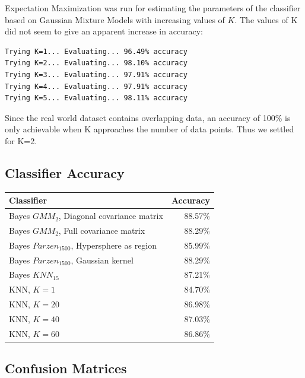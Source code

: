 \documentclass[a4paper]{article}
\begin{document}
Expectation Maximization was run for estimating the parameters of the
classifier based on Gaussian Mixture Models with increasing values of $K$.
The values of K did not seem to give an apparent increase in accuracy:

\begin{verbatim}
Trying K=1... Evaluating... 96.49% accuracy
Trying K=2... Evaluating... 98.10% accuracy
Trying K=3... Evaluating... 97.91% accuracy
Trying K=4... Evaluating... 97.91% accuracy
Trying K=5... Evaluating... 98.11% accuracy
\end{verbatim}

Since the real world dataset contains overlapping data, an accuracy of 100\%
is only achievable when K approaches the number of data points. Thus we settled
for K=2.


\subsection{Classifier Accuracy}

\begin{tabular}{ | l | r | }
\hline
\textbf{Classifier} & \textbf{Accuracy} \\
\hline
Bayes $GMM_{2}$, Diagonal covariance matrix   &   88.57\% \\
Bayes $GMM_{2}$, Full covariance matrix       &   88.29\% \\
\hline
Bayes $Parzen_{1500}$, Hypersphere as region  &   85.99\% \\
Bayes $Parzen_{1500}$, Gaussian kernel        &   88.29\% \\
\hline
Bayes $KNN_{15}$                              &   87.21\% \\
\hline
KNN, $K=1$                                    &   84.70\% \\
KNN, $K=20$                                   &   86.98\% \\
KNN, $K=40$                                   &   87.03\% \\
KNN, $K=60$                                   &   86.86\% \\
\hline
\end{tabular}


\newpage
\subsection{Confusion Matrices}
\end{document}
